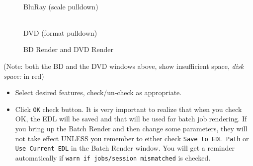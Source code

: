 \begin{figure}[htpb]
    \centering
    \begin{minipage}[h]{0.49\linewidth}
         \\ BluRay (scale pulldown)
    \end{minipage}
    \begin{minipage}[h]{0.49\linewidth}
         \\ DVD (format pulldown)
    \end{minipage}
    \caption{BD Render and DVD Render}
    \label{fig:bluray_dvd}
\end{figure}

(Note: both the BD and the DVD windows above, show insufficient space, \textit{disk space:} in red)

\begin{itemize}
    \item Select desired features, check/un-check as appropriate.
    \item Click \texttt{OK} check button.  It is very important to realize that when you check OK, the EDL will be saved and that will be used for batch job rendering.  If you bring up the Batch Render and then change some parameters, they will not take effect UNLESS you remember to either check	\texttt{Save to EDL Path} or \texttt{Use Current EDL} in the Batch Render window.  You will get a reminder automatically if \texttt{warn if jobs/session mismatched} is checked.
\end{itemize}

